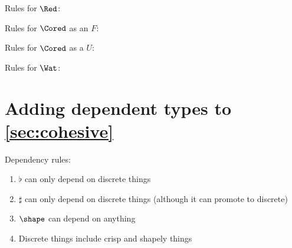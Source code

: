 \documentclass[a4paper,12pt]{article}
\begin{document}
Rules for $\Red$:
Rules for $\Cored$ as an $F$:
Rules for $\Cored$ as a $U$:
Rules for $\Wat$:

\newpage
\section{Adding dependent types to \cref{sec:cohesive}}
\label{sec:dependent-cohesive}

Dependency rules:
\begin{enumerate}
    \item $\flat$ can only depend on discrete things
    \item $\sharp$ can only depend on discrete things (although it can promote to discrete)
    \item $\shape$ can depend on anything
    \item Discrete things include crisp and shapely things
\end{enumerate}
\end{document}
